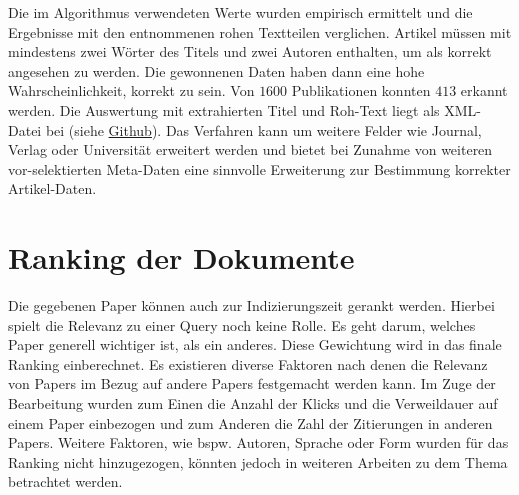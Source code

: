 Die im Algorithmus verwendeten Werte wurden empirisch ermittelt und die Ergebnisse mit
den entnommenen rohen Textteilen verglichen. Artikel
müssen mit mindestens zwei Wörter des Titels und zwei Autoren
enthalten, um als korrekt angesehen zu werden. Die gewonnenen Daten
haben dann eine hohe Wahrscheinlichkeit, korrekt zu sein. Von $1600$
Publikationen konnten $413$ erkannt werden. Die Auswertung mit
extrahierten Titel und Roh-Text liegt als XML-Datei bei (siehe \href{https://github.com/43ndr1k/Digital-Text-Forensics/blob/develop/Dokumentation/res/heuristic_search_results.xml}{Github}). Das
Verfahren kann um weitere Felder wie Journal, Verlag oder Universität
erweitert werden und bietet bei Zunahme von weiteren vor-selektierten
Meta-Daten eine sinnvolle Erweiterung zur Bestimmung korrekter Artikel-Daten.

\section{Ranking der Dokumente}\label{sec:ranking}


Die gegebenen Paper können auch zur Indizierungszeit gerankt
werden. Hierbei spielt die Relevanz zu einer Query noch keine
Rolle. Es geht darum, welches Paper generell wichtiger ist, als ein
anderes. Diese Gewichtung wird in das finale Ranking einberechnet. Es
existieren diverse Faktoren nach denen die Relevanz von Papers im
Bezug auf andere Papers festgemacht werden kann. Im Zuge der
Bearbeitung wurden zum Einen die Anzahl der Klicks und die
Verweildauer auf einem Paper einbezogen und zum Anderen die Zahl der
Zitierungen in anderen Papers. Weitere Faktoren, wie bspw. Autoren,
Sprache oder Form wurden für das Ranking nicht hinzugezogen, könnten
jedoch in weiteren Arbeiten zu dem Thema betrachtet werden.  \\

